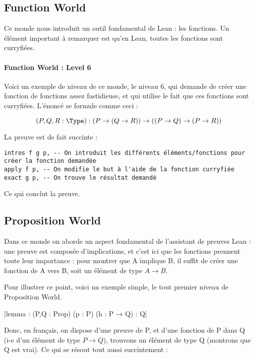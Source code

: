 
\subsection{Function World}
Ce monde nous introduit un outil fondamental de Lean : les fonctions. 
Un élément important à remarquer est qu'en Lean, toutes les fonctions sont curryfiées.


\paragraph{Function World : Level 6}
Voici un exemple de niveau de ce monde, le niveau 6, qui demande de créer une fonction de fonctions assez fastidieuse, et qui utilise le fait que ces fonctions sont curryfiées. 
L'énoncé se formule comme ceci : 

\begin{equation*}
        (P, Q, R : \Type) : (P \to (Q \to R)) \to ((P \to Q) \to (P \to R))
\end{equation*}

La preuve est de fait succinte : 
\begin{verbatim}
intros f g p, -- On introduit les différents éléments/fonctions pour créer la fonction demandée 
apply f p, -- On modifie le but à l'aide de la fonction curryfiée 
exact g p, -- On trouve le résultat demandé 
\end{verbatim}
Ce qui conclut la preuve.

\subsection{Proposition World}
Dans ce monde on aborde un aspect fondamental de l'assistant de preuves Lean : une preuve est composée d'implications, et c'est ici que les fonctions prennent toute leur importance : pour montrer que A implique B, il suffit de créer une fonction de A vers B, soit un élément de type $A \to B$.

Pour illustrer ce point, voici un exemple simple, le tout premier niveau de Proposition World. 

|lemma : (P,Q : Prop) (p : P) (h : P → Q) : Q|

Donc, en français, on dispose d'une preuve de P, et d'une fonction de P dans Q (i-e d'un élément de type $P \to Q$), trouvons un élément de type Q (montrons que Q est vrai). 
Ce qui se résout tout aussi succintement : 

